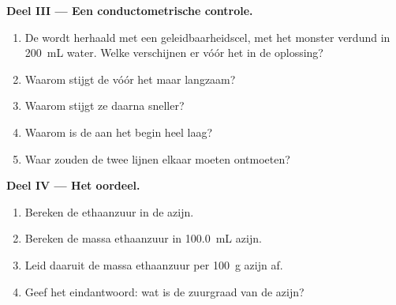 \begin{problem}
\medskip
\noindent\textbf{Deel III --- Een conductometrische controle.}
\begin{enumerate}[resume]
  \item De  wordt herhaald met een geleidbaarheidscel, met het
        monster verdund in \qty{200}{mL} water. Welke  verschijnen er
        vóór het  in de oplossing?
  \item Waarom stijgt de  vóór het  maar
        langzaam?
  \item Waarom stijgt ze daarna sneller?
  \item Waarom is de  aan het begin heel laag?
  \item Waar zouden de twee lijnen elkaar moeten ontmoeten?
\end{enumerate}

\medskip
\noindent\textbf{Deel IV --- Het oordeel.}
\begin{enumerate}[resume]
  \item Bereken de  ethaanzuur in de azijn.
  \item Bereken de massa ethaanzuur in \qty{100.0}{mL} azijn.
  \item Leid daaruit de massa ethaanzuur per \qty{100}{g} azijn af.
  \item Geef het eindantwoord: wat is de zuurgraad van de azijn?
\end{enumerate}
\end{problem}
